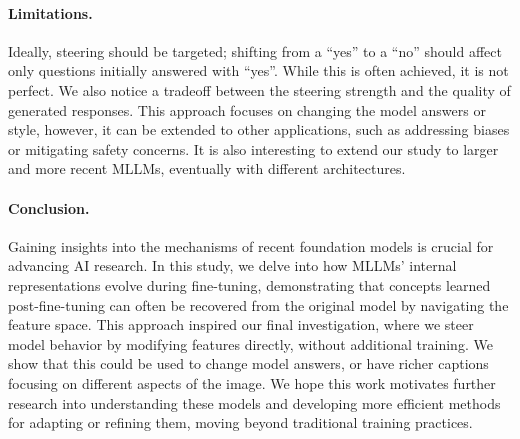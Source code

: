 \paragraph{Limitations.} Ideally, steering should be targeted; shifting from a “yes” to a “no” should affect only questions initially answered with “yes”. While this is often achieved, it is not perfect. We also notice a tradeoff between the steering strength and the quality of generated responses. 
This approach focuses on changing the model answers or style, however, it can be extended to other applications, such as addressing biases or mitigating safety concerns. It is also interesting to extend our study to larger and more recent MLLMs, eventually with different architectures.
\paragraph{Conclusion.} Gaining insights into the mechanisms of recent foundation models is crucial for advancing AI research. In this study, we delve into how MLLMs’ internal representations evolve during fine-tuning, demonstrating that concepts learned post-fine-tuning can often be recovered from the original model by navigating the feature space. This approach inspired our final investigation, where we steer model behavior by modifying features directly, without additional training. We show that this could be used to change model answers, or have richer captions focusing on different aspects of the image. We hope this work motivates further research into understanding these models and developing more efficient methods for adapting or refining them, moving beyond traditional training practices.





